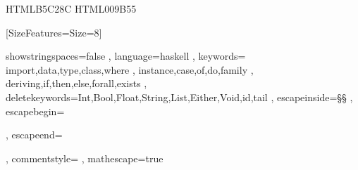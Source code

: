 \usepackage{xcolor}
\definecolor{YellowGreen} {HTML}{B5C28C}
\definecolor{ForestGreen} {HTML}{009B55}

\usepackage{xltxtra} %
\usepackage{polyglossia}
\setmainlanguage{russian}


\let\cyrillicfonttt\monofamily
 \newfontfamily{}[SizeFeatures={Size=8}]

\usepackage{listings}
         { showstringspaces=false
         , language=haskell
         , keywords={ import,data,type,class,where
                    , instance,case,of,do,family
                    , deriving,if,then,else,forall,exists
                    }
         , deletekeywords={Int,Bool,Float,String,List,Either,Void,id,tail}
          , escapeinside=§§
          , escapebegin=\begin{russian}\color{red}
          , escapeend=\end{russian}
          , commentstyle=\color{DarkGreen}
         , mathescape=true
}

